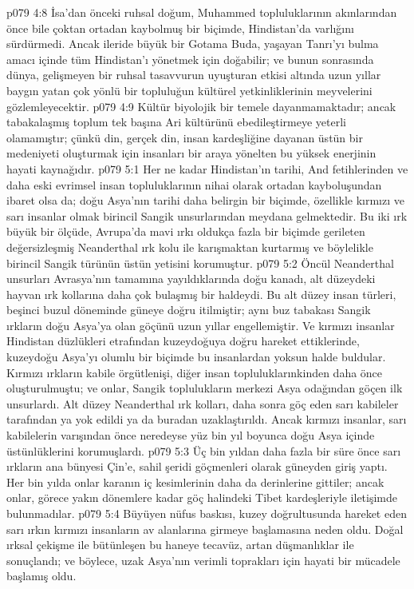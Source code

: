 \vs p079 4:8 İsa’dan önceki ruhsal doğum, Muhammed topluluklarının akınlarından önce bile çoktan ortadan kaybolmuş bir biçimde, Hindistan’da varlığını sürdürmedi. Ancak ileride büyük bir Gotama Buda, yaşayan Tanrı’yı bulma amacı içinde tüm Hindistan’ı yönetmek için doğabilir; ve bunun sonrasında dünya, gelişmeyen bir ruhsal tasavvurun uyuşturan etkisi altında uzun yıllar baygın yatan çok yönlü bir topluluğun kültürel yetkinliklerinin meyvelerini gözlemleyecektir.
\vs p079 4:9 Kültür biyolojik bir temele dayanmamaktadır; ancak tabakalaşmış toplum tek başına Ari kültürünü ebedileştirmeye yeterli olamamıştır; çünkü din, gerçek din, insan kardeşliğine dayanan üstün bir medeniyeti oluşturmak için insanları bir araya yönelten bu yüksek enerjinin hayati kaynağıdır.
\vs p079 5:1 Her ne kadar Hindistan’ın tarihi, And fetihlerinden ve daha eski evrimsel insan topluluklarının nihai olarak ortadan kayboluşundan ibaret olsa da; doğu Asya’nın tarihi daha belirgin bir biçimde, özellikle kırmızı ve sarı insanlar olmak birincil Sangik unsurlarından meydana gelmektedir. Bu iki ırk büyük bir ölçüde, Avrupa’da mavi ırkı oldukça fazla bir biçimde gerileten değersizleşmiş Neanderthal ırk kolu ile karışmaktan kurtarmış ve böylelikle birincil Sangik türünün üstün yetisini korumuştur.
\vs p079 5:2 Öncül Neanderthal unsurları Avrasya’nın tamamına yayıldıklarında doğu kanadı, alt düzeydeki hayvan ırk kollarına daha çok bulaşmış bir haldeydi. Bu alt düzey insan türleri, beşinci buzul döneminde güneye doğru itilmiştir; aynı buz tabakası Sangik ırkların doğu Asya’ya olan göçünü uzun yıllar engellemiştir. Ve kırmızı insanlar Hindistan düzlükleri etrafından kuzeydoğuya doğru hareket ettiklerinde, kuzeydoğu Asya’yı olumlu bir biçimde bu insanlardan yoksun halde buldular. Kırmızı ırkların kabile örgütlenişi, diğer insan topluluklarınkinden daha önce oluşturulmuştu; ve onlar, Sangik toplulukların merkezi Asya odağından göçen ilk unsurlardı. Alt düzey Neanderthal ırk kolları, daha sonra göç eden sarı kabileler tarafından ya yok edildi ya da buradan uzaklaştırıldı. Ancak kırmızı insanlar, sarı kabilelerin varışından önce neredeyse yüz bin yıl boyunca doğu Asya içinde üstünlüklerini korumuşlardı.
\vs p079 5:3 Üç bin yıldan daha fazla bir süre önce sarı ırkların ana bünyesi Çin’e, sahil şeridi göçmenleri olarak güneyden giriş yaptı. Her bin yılda onlar karanın iç kesimlerinin daha da derinlerine gittiler; ancak onlar, görece yakın dönemlere kadar göç halindeki Tibet kardeşleriyle iletişimde bulunmadılar.
\vs p079 5:4 Büyüyen nüfus baskısı, kuzey doğrultusunda hareket eden sarı ırkın kırmızı insanların av alanlarına girmeye başlamasına neden oldu. Doğal ırksal çekişme ile bütünleşen bu haneye tecavüz, artan düşmanlıklar ile sonuçlandı; ve böylece, uzak Asya’nın verimli toprakları için hayati bir mücadele başlamış oldu.
